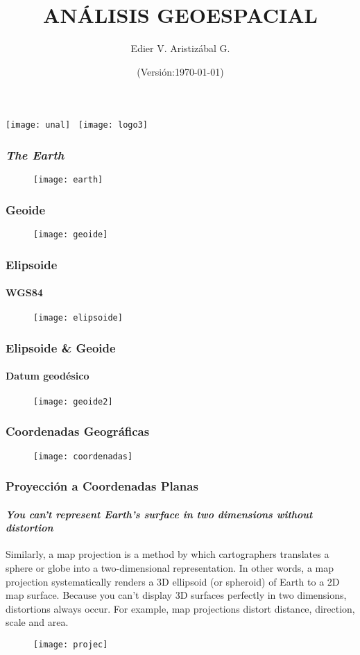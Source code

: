 \documentclass[14pt]{beamer}
\title[GIS - CRS]{ANÁLISIS GEOESPACIAL}
\author[Edier Aristizábal]{Edier V. Aristizábal G.}
\institute{\emph{evaristizabalg@unal.edu.co}}
\date{\tiny{(Versión:\today)}}
\begin{document}
\begin{frame}
\titlepage
\centering
	\texttt{[image: unal]}\hspace*{4.75cm}~%
   	\texttt{[image: logo3]}
\end{frame}
\begin{frame}
\frametitle{\emph{The Earth}}
  \begin{figure}
    \centering
    \texttt{[image: earth]}
   \end{figure}
\end{frame}
\begin{frame}
\frametitle{Geoide}
  \begin{figure}
    \centering
    \texttt{[image: geoide]}
  \end{figure}
\end{frame}
\begin{frame}
\frametitle{Elipsoide}
\framesubtitle{WGS84}
  \begin{figure}
    \centering
    \texttt{[image: elipsoide]}
  \end{figure}
\end{frame}
\begin{frame}
\frametitle{Elipsoide \& Geoide}
\framesubtitle{Datum geodésico}
  \begin{figure}
    \centering
    \texttt{[image: geoide2]}
  \end{figure}
\end{frame}
\begin{frame}
\frametitle{Coordenadas Geográficas}
  \begin{figure}
    \centering
    \texttt{[image: coordenadas]}
  \end{figure}
\end{frame}
\begin{frame}
\frametitle{Proyección a Coordenadas Planas}
\framesubtitle{\emph{You can’t represent Earth’s surface in two dimensions without distortion}}
\scriptsize{Similarly, a map projection is a method by which cartographers translates a sphere or globe into a two-dimensional representation. In other words, a map projection systematically renders a 3D ellipsoid (or spheroid) of Earth to a 2D map surface. Because you can’t display 3D surfaces perfectly in two dimensions, distortions always occur. For example, map projections distort distance, direction, scale and area.}
  \begin{figure}
    \centering
    \texttt{[image: projec]}
  \end{figure}
\end{frame}
\end{document}
